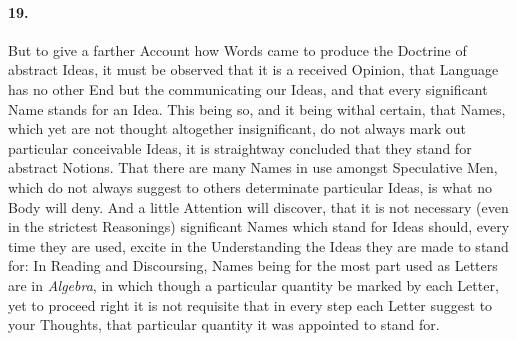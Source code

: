 \documentclass[]{article}
\newenvironment{sectionbody}{\begin{multicols}{2}}{\end{multicols}}
\begin{document}
\begin{sectionbody}
\paragraph{19.} But to give a farther Account how Words came to produce the
Doctrine of abstract Ideas, it must be observed that it is a
received Opinion, that Language has no other End but the
communicating our Ideas, and that every significant Name stands
for an Idea.  This being so, and it being withal certain, that
Names, which yet are not thought altogether insignificant, do not
always mark out particular conceivable Ideas, it is straightway
concluded that they stand for abstract Notions.  That there are
many Names in use amongst Speculative Men, which do not always
suggest to others determinate particular Ideas, is what no Body
will deny.  And a little Attention will discover, that it is not
necessary (even in the strictest Reasonings) significant Names
which stand for Ideas should, every time they are used, excite in
the Understanding the Ideas they are made to stand for:  In
Reading and Discoursing, Names being for the most part used as
Letters are in \emph{Algebra}, in which though a particular
quantity be marked by each Letter, yet to proceed right it is not
requisite that in every step each Letter suggest to your
Thoughts, that particular quantity it was appointed to stand for.




\end{sectionbody}
\end{document}
